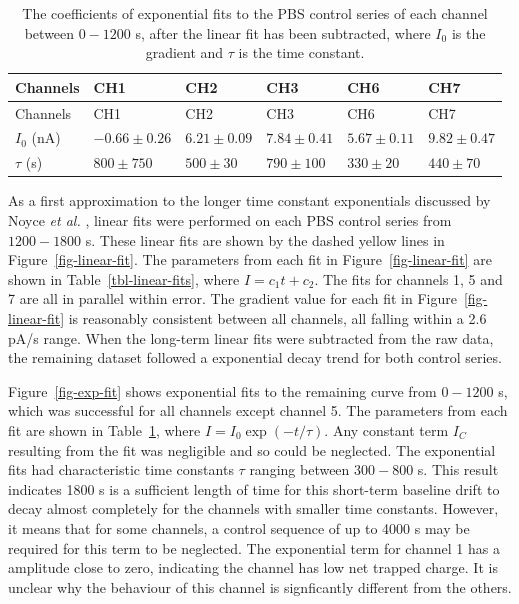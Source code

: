 \documentclass[
  a4paper,
]{scrbook}
\begin{document}
\hypertarget{tbl-exp-fits}{}
\begin{longtable}[]{@{}llllll@{}}
\caption{\label{tbl-exp-fits}The coefficients of exponential fits to the
PBS control series of each channel between \(0-1200\) s, after the
linear fit has been subtracted, where \(I_0\) is the gradient and
\(\tau\) is the time constant.\\
}\tabularnewline
\toprule\noalign{}
Channels & CH1 & CH2 & CH3 & CH6 & CH7 \\
\midrule\noalign{}
\endfirsthead
\toprule\noalign{}
Channels & CH1 & CH2 & CH3 & CH6 & CH7 \\
\midrule\noalign{}
\endhead
\bottomrule\noalign{}
\endlastfoot
\(I_0\) (nA) & \(-0.66\pm0.26\) & \(6.21\pm0.09\) & \(7.84\pm0.41\) &
\(5.67\pm0.11\) & \(9.82\pm0.47\) \\
\(\tau\) (s) & \(800\pm750\) & \(500\pm30\) & \(790\pm100\) &
\(330\pm20\) & \(440\pm70\) \\
\end{longtable}

As a first approximation to the longer time constant exponentials
discussed by Noyce \emph{et al.} \autocite{Noyce2019}, linear fits were
performed on each PBS control series from \(1200-1800\) s. These linear
fits are shown by the dashed yellow lines in
Figure~\ref{fig-linear-fit}. The parameters from each fit in
Figure~\ref{fig-linear-fit} are shown in Table~\ref{tbl-linear-fits},
where \(I = c_1t + c_2\). The fits for channels 1, 5 and 7 are all in
parallel within error. The gradient value for each fit in
Figure~\ref{fig-linear-fit} is reasonably consistent between all
channels, all falling within a 2.6 pA/s range. When the long-term linear
fits were subtracted from the raw data, the remaining dataset followed a
exponential decay trend for both control series.

Figure~\ref{fig-exp-fit} shows exponential fits to the remaining curve
from \(0-1200\) s, which was successful for all channels except channel
5. The parameters from each fit are shown in Table~\ref{tbl-exp-fits},
where \(I = I_0\exp(-t/\tau)\). Any constant term \(I_C\) resulting from
the fit was negligible and so could be neglected. The exponential fits
had characteristic time constants \(\tau\) ranging between \(300 - 800\)
s. This result indicates 1800 s is a sufficient length of time for this
short-term baseline drift to decay almost completely for the channels
with smaller time constants. However, it means that for some channels, a
control sequence of up to 4000 s may be required for this term to be
neglected. The exponential term for channel 1 has a amplitude close to
zero, indicating the channel has low net trapped charge. It is unclear
why the behaviour of this channel is signficantly different from the
others.
\end{document}
